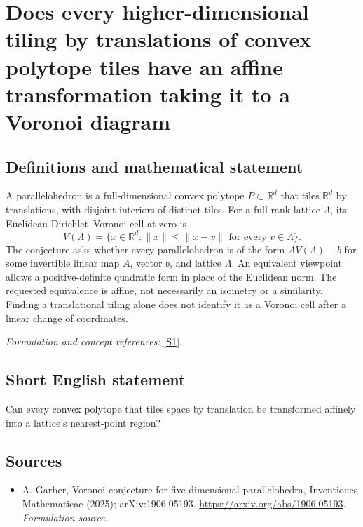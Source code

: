 \documentclass[11pt]{article}
\begin{document}
\section*{\texorpdfstring{Does every higher-dimensional tiling by translations of convex polytope tiles have an affine transformation taking it to a Voronoi diagram}{Does every higher-dimensional tiling by translations of convex polytope tiles have an affine transformation taking it to a Voronoi diagram}}\label{statement}
\subsection{Definitions and mathematical statement}
A parallelohedron is a full-dimensional convex polytope $P\subset{\mathbb{R}}^d$ that tiles ${\mathbb{R}}^d$ by translations, with disjoint interiors of distinct tiles. For a full-rank lattice $\Lambda$, its Euclidean Dirichlet--Voronoi cell at zero is
\[
 V(\Lambda)=\{x\in{\mathbb{R}}^d:\|x\|\le\|x-v\|
                 \text{ for every }v\in\Lambda\}.
\]
The conjecture asks whether every parallelohedron is of the form $A V(\Lambda)+b$ for some invertible linear map $A$, vector $b$, and lattice $\Lambda$. An equivalent viewpoint allows a positive-definite quadratic form in place of the Euclidean norm. The requested equivalence is affine, not necessarily an isometry or a similarity. Finding a translational tiling alone does not identify it as a Voronoi cell after a linear change of coordinates.
\par\smallskip\textit{Formulation and concept references:} \href{https://arxiv.org/abs/1906.05193}{[S1]}.

\subsection{Short English statement}
Can every convex polytope that tiles space by translation be transformed affinely into a lattice's nearest-point region?
\subsection{Sources}
\begin{itemize}
\item[S1]A. Garber, Voronoi conjecture for five-dimensional parallelohedra, Inventiones Mathematicae (2025); arXiv:1906.05193.
\url{https://arxiv.org/abs/1906.05193}.
\textit{Formulation source.}
\end{itemize}
\end{document}

